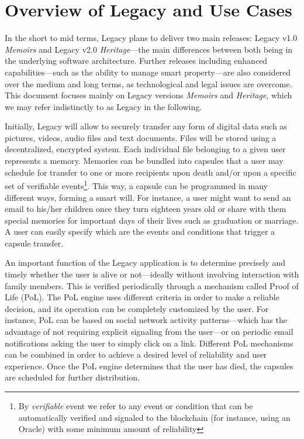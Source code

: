 
\section{Overview of Legacy and Use Cases} %
\label{sec:overview_of_legacy_and_use_cases}
In the short to mid terms, Legacy plans to deliver two main releases: Legacy v1.0 \textit{Memoirs} and Legacy v2.0 \textit{Heritage}---the main differences between both being in the underlying software architecture. Further releases including enhanced capabilities---such as the ability to manage smart property---are also considered over the medium and long terms, as technological and legal issues are overcome. This document focuses mainly on Legacy versions \textit{Memoirs} and \textit{Heritage}, which we may refer indistinctly to as Legacy in the following. 

Initially, Legacy will allow to securely transfer any form of digital data such as pictures, videos, audio files and text documents. Files will be stored using a decentralized, encrypted system. Each individual file belonging to a given user represents a memory. Memories can be bundled into capsules that a user may schedule for transfer to one or more recipients upon death and/or upon a specific set of verifiable events\footnote{By \textit{verifiable} event we refer to any event or condition that can be automatically verified and signaled to the blockchain (for instance, using an Oracle) with some minimum amount of reliability}. This way, a capsule can be programmed in many different ways, forming a smart will. For instance, a user might want to send an email to his/her children once they turn eighteen years old or share with them special memories for important days of their lives such as graduation or marriage. A user can easily specify which are the events and conditions that trigger a capsule transfer.

An important function of the Legacy application is to determine precisely and timely whether the user is alive or not---ideally without involving interaction with family members. This is verified periodically through a mechanism called Proof of Life (PoL). The PoL engine uses different criteria in order to make a reliable decision, and its operation can be completely customized by the user. For instance, PoL can be based on social network activity patterns---which has the advantage of not requiring explicit signaling from the user---or on periodic email notifications asking the user to simply click on a link. Different PoL mechanisms can be combined in order to achieve a desired level of reliability and user experience. Once the PoL engine determines that the user has died, the capsules are scheduled for further distribution.

